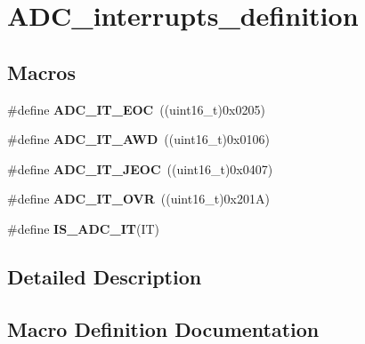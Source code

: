 \hypertarget{group___a_d_c__interrupts__definition}{}\section{A\+D\+C\+\_\+interrupts\+\_\+definition}
\label{group___a_d_c__interrupts__definition}
\subsection*{Macros}
\begin{DoxyCompactItemize}
\item 
\hypertarget{group___a_d_c__interrupts__definition_ga0ad335d835f54415194d448019569e00}{}\#define {\bfseries A\+D\+C\+\_\+\+I\+T\+\_\+\+E\+O\+C}~((uint16\+\_\+t)0x0205)\label{group___a_d_c__interrupts__definition_ga0ad335d835f54415194d448019569e00}

\item 
\hypertarget{group___a_d_c__interrupts__definition_ga2f5c7f9900c24250a0c6ccaa7cbca946}{}\#define {\bfseries A\+D\+C\+\_\+\+I\+T\+\_\+\+A\+W\+D}~((uint16\+\_\+t)0x0106)\label{group___a_d_c__interrupts__definition_ga2f5c7f9900c24250a0c6ccaa7cbca946}

\item 
\hypertarget{group___a_d_c__interrupts__definition_gad439fc0cd69706704d47aeabfeddb631}{}\#define {\bfseries A\+D\+C\+\_\+\+I\+T\+\_\+\+J\+E\+O\+C}~((uint16\+\_\+t)0x0407)\label{group___a_d_c__interrupts__definition_gad439fc0cd69706704d47aeabfeddb631}

\item 
\hypertarget{group___a_d_c__interrupts__definition_gac3852b7789860e0ea79b82115ab877a0}{}\#define {\bfseries A\+D\+C\+\_\+\+I\+T\+\_\+\+O\+V\+R}~((uint16\+\_\+t)0x201\+A)\label{group___a_d_c__interrupts__definition_gac3852b7789860e0ea79b82115ab877a0}

\item 
\#define {\bfseries I\+S\+\_\+\+A\+D\+C\+\_\+\+I\+T}(I\+T)
\end{DoxyCompactItemize}


\subsection{Detailed Description}


\subsection{Macro Definition Documentation}
\hypertarget{group___a_d_c__interrupts__definition_gaf5f8d35930becff402eeb8220641432f}{}
